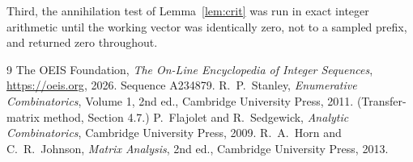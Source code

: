 \documentclass[11pt,a4paper]{article}
\theoremstyle{plain}
\theoremstyle{definition}
\begin{document}
Third, the annihilation test of Lemma~\ref{lem:crit} was run in exact integer arithmetic
until the working vector was identically zero, not to a sampled prefix, and returned zero
throughout.

\begin{thebibliography}{9}
 The OEIS Foundation, \emph{The On-Line Encyclopedia of Integer
Sequences}, \url{https://oeis.org}, 2026. Sequence A234879.
 R.~P.~Stanley, \emph{Enumerative Combinatorics}, Volume 1, 2nd ed.,
Cambridge University Press, 2011. (Transfer-matrix method, Section 4.7.)
 P.~Flajolet and R.~Sedgewick, \emph{Analytic Combinatorics}, Cambridge
University Press, 2009.
 R.~A.~Horn and C.~R.~Johnson, \emph{Matrix Analysis}, 2nd ed., Cambridge
University Press, 2013.
\end{thebibliography}
\end{document}
